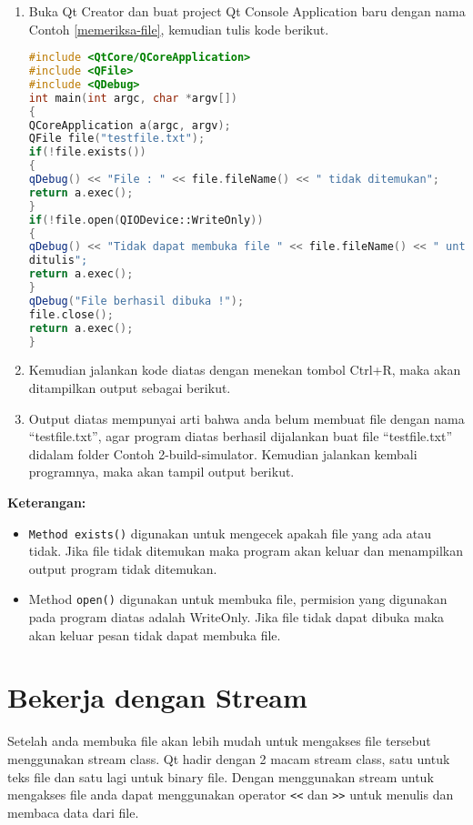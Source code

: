 \begin{enumerate}

\item
  Buka Qt Creator dan buat project Qt Console Application baru dengan
  nama Contoh \ref{memeriksa-file}, kemudian tulis kode berikut.

\begin{lstlisting}[language=c++, caption=Memeriksa apakah file ada dan bisa diakses, label=memeriksa-file]
#include <QtCore/QCoreApplication>
#include <QFile>
#include <QDebug>
int main(int argc, char *argv[])
{
QCoreApplication a(argc, argv);
QFile file("testfile.txt");
if(!file.exists())
{
qDebug() << "File : " << file.fileName() << " tidak ditemukan";
return a.exec();
}
if(!file.open(QIODevice::WriteOnly))
{
qDebug() << "Tidak dapat membuka file " << file.fileName() << " untuk
ditulis";
return a.exec();
}
qDebug("File berhasil dibuka !");
file.close();
return a.exec();
}
\end{lstlisting}
\item
  Kemudian jalankan kode diatas dengan menekan tombol Ctrl+R, maka akan
  ditampilkan output sebagai berikut.
\item
  Output diatas mempunyai arti bahwa anda belum membuat file dengan nama
  ``testfile.txt'', agar program diatas berhasil dijalankan buat file
  ``testfile.txt'' didalam folder Contoh 2-build-simulator. Kemudian
  jalankan kembali programnya, maka akan tampil output berikut.
\end{enumerate}

\textbf{Keterangan:}

\begin{itemize}

\item
  \texttt{Method\ exists()} digunakan untuk mengecek apakah file yang
  ada atau tidak. Jika file tidak ditemukan maka program akan keluar dan
  menampilkan output program tidak ditemukan.
\item
  Method \texttt{open()} digunakan untuk membuka file, permision yang
  digunakan pada program diatas adalah WriteOnly. Jika file tidak dapat
  dibuka maka akan keluar pesan tidak dapat membuka file.
\end{itemize}

\section{Bekerja dengan Stream}\label{bekerja-dengan-stream}

Setelah anda membuka file akan lebih mudah untuk mengakses file tersebut
menggunakan stream class. Qt hadir dengan 2 macam stream class, satu
untuk teks file dan satu lagi untuk binary file. Dengan menggunakan
stream untuk mengakses file anda dapat menggunakan operator
\texttt{\textless{}\textless{}} dan
\texttt{\textgreater{}\textgreater{}} untuk menulis dan membaca data
dari file.

